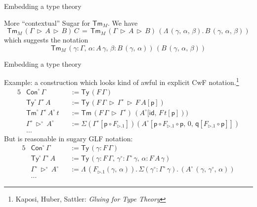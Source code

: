 \documentclass[dvipsnames,aspectratio=169]{beamer}
\newcommand{\ms}[1]{\mathsf{#1}}
\newcommand{\id}{\mathsf{id}}
\newcommand{\Con}{\mathsf{Con}}
\newcommand{\Sub}{\mathsf{Sub}}
\newcommand{\Tm}{\mathsf{Tm}}
\newcommand{\Ty}{\mathsf{Ty}}
\newcommand{\ext}{\triangleright}
\begin{document}
\begin{frame}{Embedding a type theory}

More ``contextual'' Sugar for $\Tm_M$. We have
\[  \Tm_M\,(\Gamma\,\ext\,A\,\ext\,B)\,C \,=\, \Tm_M\,(\Gamma\,\ext\,A\,\ext\,B)\,(\Lambda\,(\gamma,\,\alpha,\,\beta).\,B\,(\gamma,\,\alpha,\,\beta)) \]
which suggests the notation
\[  \Tm_M\,(\gamma : \Gamma,\,\alpha : A\,\gamma,\,\beta : B\,(\gamma,\,\alpha))\,(B\,(\gamma,\,\alpha,\,\beta)) \]

\end{frame}

\begin{frame}{Embedding a type theory}

Example: a construction which looks kind of awful in explicit CwF notation.\footnote{Kaposi, Huber, Sattler: \emph{Gluing for Type Theory}}
{\small
\begin{alignat*}{5}
  &\Con^{\circ}\,\Gamma && := \Ty\,(F\,\Gamma)\\
  &\Ty^{\circ}\,\Gamma^{\circ}\,A && := \Ty\,(F\,\Gamma\,\ext\,\Gamma^{\circ}\,\ext\,F\,A[\ms{p}])\\
  &\Tm^{\circ}\,\Gamma^{\circ}\,A^{\circ}\,t && := \Tm\,(F\,\Gamma\,\ext\,\Gamma^{\circ})\,(A^{\circ}[\id,\,F\,t[\ms{p}]))\\
  & \Gamma^{\circ}\,\ext^{\circ}\,A^{\circ} && := \Sigma(\Gamma^{\circ}[\ms{p}\circ F_{\ext.1}])(A^{\circ}[\ms{p} \circ F_{\ext.1} \circ \ms{p},\,0,\,\ms{q}[F_{\ext.1} \circ \ms{p}]])\\
  & ... &&
\end{alignat*}
But is reasonable in sugary GLF notation:
\begin{alignat*}{5}
  &\Con^{\circ}\,\Gamma && := \Ty\,(\gamma : F\,\Gamma)\\
  &\Ty^{\circ}\,\Gamma^{\circ}\,A && := \Ty\,(\gamma : F\,\Gamma,\,\gamma^{\circ} : \Gamma^{\circ}\,\gamma,\,\alpha : F\,A\,\gamma)\\
  & \Gamma^{\circ}\,\ext^{\circ}\,A^{\circ} &&:= \Lambda\,(F_{\ext.1}(\gamma,\,\alpha)).\, \Sigma(\gamma^{\circ} : \Gamma^{\circ}\,\gamma).\,(A^{\circ}\,(\gamma,\,\gamma^{\circ},\,\alpha))   \\
  & ... &&
\end{alignat*}
}

\end{frame}
\end{document}
